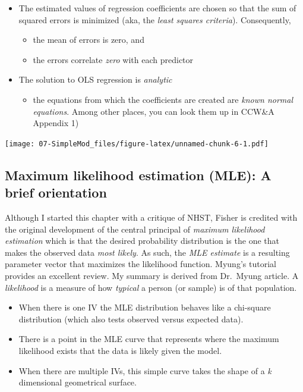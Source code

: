 \documentclass[
  11pt,
]{book}
\providecommand{\tightlist}{%
  \setlength{\itemsep}{0pt}\setlength{\parskip}{0pt}}
\begin{document}
\begin{itemize}
\tightlist
\item
  The estimated values of regression coefficients are chosen so that the sum of squared errors is minimized (aka, the \emph{least squares criteria}). Consequently,

  \begin{itemize}
  \tightlist
  \item
    the mean of errors is zero, and
  \item
    the errors correlate \emph{zero} with each predictor
  \end{itemize}
\item
  The solution to OLS regression is \emph{analytic}

  \begin{itemize}
  \tightlist
  \item
    the equations from which the coefficients are created are \emph{known normal equations}. Among other places, you can look them up in CCW\&A \citep{cohen_introduction_1934} Appendix 1)
  \end{itemize}
\end{itemize}

\texttt{[image: 07-SimpleMod\_files/figure-latex/unnamed-chunk-6-1.pdf]}

\hypertarget{maximum-likelihood-estimation-mle-a-brief-orientation}{%
\subsection{Maximum likelihood estimation (MLE): A brief orientation}\label{maximum-likelihood-estimation-mle-a-brief-orientation}}

Although I started this chapter with a critique of NHST, Fisher is credited \citep{myung_tutorial_2003} with the original development of the central principal of \emph{maximum likelihood estimation} which is that the desired probability distribution is the one that makes the observed data \emph{most likely}. As such, the \emph{MLE estimate} is a resulting parameter vector that maximizes the likelihood function. Myung's \citeyearpar{myung_tutorial_2003} tutorial provides an excellent review. My summary is derived from Dr.~Myung article. A \emph{likelihood} is a measure of how \emph{typical} a person (or sample) is of that population.

\begin{itemize}
\tightlist
\item
  When there is one IV the MLE distribution behaves like a chi-square distribution (which also tests observed versus expected data).
\item
  There is a point in the MLE curve that represents where the maximum likelihood exists that the data is likely given the model.
\item
  When there are multiple IVs, this simple curve takes the shape of a \emph{k} dimensional geometrical surface.
\end{itemize}
\end{document}
